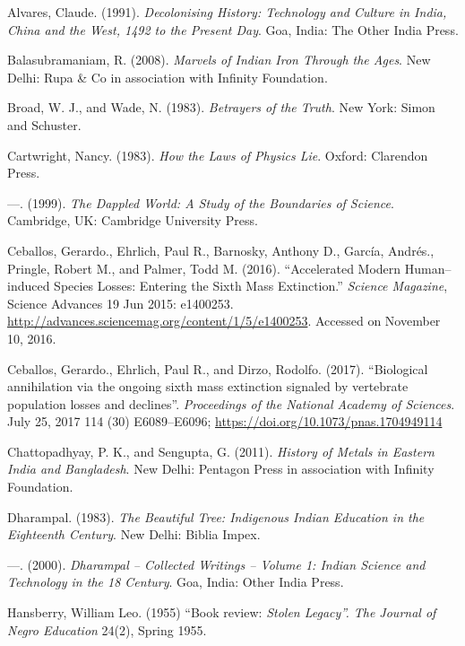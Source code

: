 \begin{thebibliography}{99}
 Alvares, Claude. (1991). \textit{Decolonising History: Technology and Culture in India, China and the West, 1492 to the Present Day}. Goa, India: The Other India Press.

  Balasubramaniam, R. (2008). \textit{Marvels of Indian Iron Through the Ages}. New Delhi: Rupa \& Co in association with Infinity Foundation.

  Broad, W. J., and Wade, N. (1983). \textit{Betrayers of the Truth}. New York: Simon and Schuster.

  Cartwright, Nancy. (1983). \textit{How the Laws of Physics Lie}. Oxford: Clarendon Press.

  —. (1999). \textit{The Dappled World: A Study of the Boundaries of Science}. Cambridge, UK: Cambridge University Press.

  Ceballos, Gerardo., Ehrlich, Paul R., Barnosky, Anthony D., García, Andrés., Pringle, Robert M., and Palmer, Todd M. (2016). “Accelerated Modern Human–induced Species Losses: Entering the Sixth Mass Extinction.” \textit{Science Magazine}, Science Advances 19 Jun 2015: e1400253. \url{http://advances.sciencemag.org/content/1/5/e1400253}. Accessed on November 10, 2016.

  Ceballos, Gerardo., Ehrlich, Paul R., and Dirzo, Rodolfo. (2017). “Biological annihilation via the ongoing sixth mass extinction signaled by vertebrate population losses and declines”. \textit{Proceedings of the National Academy of Sciences}. July 25, 2017 114 (30) E6089–E6096; \url{https://doi.org/10.1073/pnas.1704949114}

  Chattopadhyay, P. K., and Sengupta, G. (2011). \textit{History of Metals in Eastern India and Bangladesh}. New Delhi: Pentagon Press in association with Infinity Foundation.

  Dharampal. (1983). \textit{The Beautiful Tree: Indigenous Indian Education in the Eighteenth Century}. New Delhi: Biblia Impex.

  —. (2000). \textit{Dharampal – Collected Writings – Volume 1: Indian Science and Technology in the 18 Century}. Goa, India: Other India Press.

  Hansberry, William Leo. (1955) “Book review: \textit{Stolen Legacy”. The Journal of Negro Education} 24(2), Spring 1955.


\end{thebibliography}
